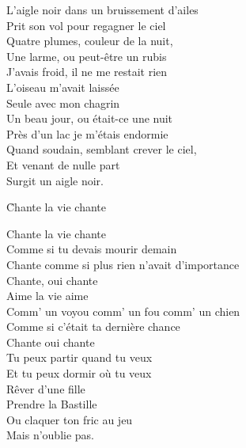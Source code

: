 \documentclass{novel}
\begin{document}
{\begin{minipage}[t][0.4\textheight][t]{\textwidth}
\begin{multicols}{2}
\small
L'aigle noir dans un bruissement d'ailes \\
Prit son vol pour regagner le ciel \footnotesize \\

\small
Quatre plumes, couleur de la nuit, \\
Une larme, ou peut-être un rubis \\
J'avais froid, il ne me restait rien \\
L'oiseau m'avait laissée \\
Seule avec mon chagrin  \footnotesize \\

\small
Un beau jour, ou était-ce une nuit \\
Près d'un lac je m'étais endormie \\
Quand soudain, semblant crever le ciel, \\
Et venant de nulle part \\
Surgit un aigle noir.

\end{multicols}
\end{minipage}

\vspace{0.08\textheight}
\begin{minipage}[t][0.65\textheight][t]{\textwidth}
\h*{Chante la vie chante}
\begin{multicols}{2}
\small
Chante la vie chante \\
Comme si tu devais mourir demain \\
Chante comme si plus rien n'avait d'importance \\
Chante, oui chante \\
Aime la vie aime \\
Comm' un voyou comm' un fou comm' un chien \\
Comme si c'était ta dernière chance \\
Chante oui chante \\
Tu peux partir quand tu veux \\
Et tu peux dormir où tu veux \\
Rêver d'une fille \\
Prendre la Bastille \\
Ou claquer ton fric au jeu \\
Mais n'oublie pas. \\


\end{multicols}
\end{minipage}}
\end{document}
